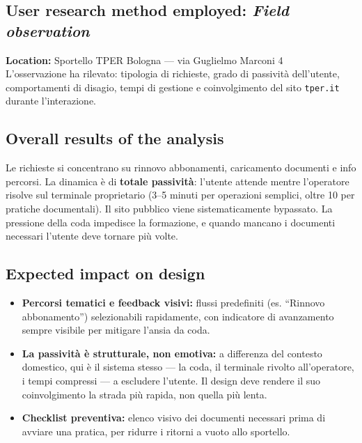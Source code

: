 \documentclass[11pt,a4paper]{article}
\begin{document}
\subsection*{User research method employed: \textit{Field observation}}
\begin{tcolorbox}[colback=backgroundColor,colframe=borderColor,arc=2mm]
\textbf{Location:} Sportello TPER Bologna --- via Guglielmo Marconi 4
\\[0.3cm]
L'osservazione ha rilevato: tipologia di richieste, grado di passività
dell'utente, comportamenti di disagio, tempi di gestione e
coinvolgimento del sito \texttt{tper.it} durante l'interazione.
\end{tcolorbox}

\subsection*{Overall results of the analysis}
\begin{tcolorbox}[colback=backgroundColor,colframe=borderColor,arc=2mm]
Le richieste si concentrano su rinnovo abbonamenti, caricamento
documenti e info percorsi. La dinamica è di \textbf{totale passività}:
l'utente attende mentre l'operatore risolve sul terminale proprietario
(3--5 minuti per operazioni semplici, oltre 10 per pratiche documentali).
Il sito pubblico viene sistematicamente bypassato. La pressione della
coda impedisce la formazione, e quando mancano i documenti necessari
l'utente deve tornare più volte.
\end{tcolorbox}

\subsection*{Expected impact on design}
\begin{tcolorbox}[colback=backgroundColor,colframe=borderColor,arc=2mm]

\begin{itemize}[leftmargin=*,itemsep=6pt]

    \item \textbf{Percorsi tematici e feedback visivi:}
    flussi predefiniti (es. ``Rinnovo abbonamento'') selezionabili
    rapidamente, con indicatore di avanzamento sempre visibile per
    mitigare l'ansia da coda.

    \item \textbf{La passività è strutturale, non emotiva:}
    a differenza del contesto domestico, qui è il sistema stesso ---
    la coda, il terminale rivolto all'operatore, i tempi compressi ---
    a escludere l'utente. Il design deve rendere il suo coinvolgimento
    la strada più rapida, non quella più lenta.

    \item \textbf{Checklist preventiva:} elenco visivo dei documenti
    necessari prima di avviare una pratica, per ridurre i ritorni a
    vuoto allo sportello.

\end{itemize}
\end{tcolorbox}
\end{document}
